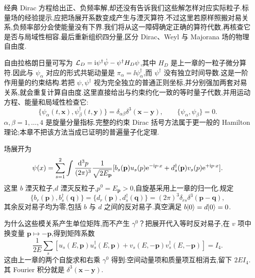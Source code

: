 \label{ch:dirac-quantization}

经典 Dirac 方程给出正、负频率解,却还没有告诉我们这些解怎样对应实际粒子.标量场的经验提示,应把场展开系数变成产生与湮灭算符.不过这里若原样照搬对易关系,负频率部分会使能量没有下界.我们将从这一障碍确定正确的算符代数,再核查它是否与局域性相容.最后重新组织四分量,区分 Dirac、Weyl 与 Majorana 场的物理自由度.


自由拉格朗日量可写为 $\mathcal L_D=\mathrm i\psi^\dagger\dot\psi-\psi^\dagger H_D\psi$,其中 $H_D$ 是上一章的一粒子微分算符.因此与 $\psi_\alpha$ 对应的形式共轭动量是 $\pi_\alpha=\ii\psi_\alpha^\dagger$,而 $\psi^\dagger$ 没有独立时间导数.这是一阶作用量的约束结构.若把 $\psi,\psi^\dagger$ 视为完全独立的普通正则坐标,并分别强加两套对易关系,就会重复计算自由度.这里直接给出与约束约化一致的等时量子代数,并用运动方程、能量和局域性检查它:
\begin{equation}
 \{\psi_\alpha(t,\mathbf x),\psi_\beta^\dagger(t,\mathbf y)\}
 =\delta_{\alpha\beta}\delta^3(\mathbf x-\mathbf y),
 \qquad \{\psi_\alpha,\psi_\beta\}=0.
 \label{eq:dirac-etcr}
\end{equation}
$\alpha,\beta=1,\ldots,4$ 是旋量分量指标.完整的约束 Dirac 括号方法属于更一般的 Hamilton 理论;本章不把该方法当成已证明的普遍量子化定理.

场展开为
\begin{equation}
 \psi(x)=\sum_{s=1}^2\int\frac{\mathrm d^3p}{(2\pi)^3}\frac{1}{\sqrt{2E_{\mathbf p}}}
 [b_s(\mathbf p)u_s(p)\mathrm e^{-\mathrm i p\cdot x}
   +d_s^\dagger(\mathbf p)v_s(p)\mathrm e^{+\mathrm i p\cdot x}].
 \label{eq:dirac-field-expansion}
\end{equation}
这里 $b$ 湮灭粒子,$d$ 湮灭反粒子,$p^0=E_{\mathbf p}>0$,自旋基采用上一章的归一化.规定
\begin{equation}
 \{b_r(\mathbf p),b_s^\dagger(\mathbf q)\}
 =\{d_r(\mathbf p),d_s^\dagger(\mathbf q)\}
 =(2\pi)^3\delta_{rs}\delta^3(\mathbf p-\mathbf q),
 \label{eq:dirac-mode-car}
\end{equation}
其余反对易子均为零,包括 $b$ 与 $d$ 之间的反对易子.真空满足 $b\lvert 0\rangle=d\lvert 0\rangle=0$.

为什么这些模关系产生单位矩阵,而不产生 $\gamma^0$？把展开代入等时反对易子,在 $v$ 项中换变量 $\mathbf p\mapsto-\mathbf p$,得到矩阵系数
\begin{equation}
 \frac{1}{2E}\sum_s[u_s(E,\mathbf p)u_s^\dagger(E,\mathbf p)
   +v_s(E,-\mathbf p)v_s^\dagger(E,-\mathbf p)]=I_4.
\end{equation}
这由上一章的两个自旋求和右乘 $\gamma^0$ 得到:空间动量项和质量项互相消去,留下 $2EI_4$.其 Fourier 积分就是 $\delta^3(\mathbf x-\mathbf y)$.

